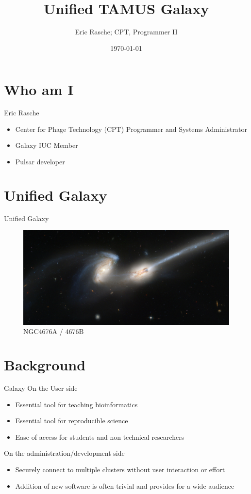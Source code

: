 \documentclass[]{beamer}
\title[TAMUS Galaxy]{Unified TAMUS Galaxy}
\author{Eric Rasche; CPT, Programmer II}
\date{\today}
\begin{document}
\frame{\titlepage}
\section{Who am I}
\begin{frame}{Eric Rasche}
\begin{itemize}
\item
    Center for Phage Technology (CPT) Programmer and Systems Administrator
\item
    Galaxy IUC Member
\item
    Pulsar developer
\end{itemize}
\end{frame}


\section{Unified Galaxy}
\begin{frame}{Unified Galaxy}
\begin{figure}[htbp]
\centering
\includegraphics[scale=0.20]{NGC4676.png}
\caption{NGC4676A / 4676B}
\end{figure}
\end{frame}


\section{Background}
\begin{frame}{Galaxy}
On the User side
\begin{itemize}
\item
    Essential tool for teaching bioinformatics
\item
    Essential tool for reproducible science
\item
    Ease of access for students and non-technical researchers
\end{itemize}

On the administration/development side
\begin{itemize}
\item
    Securely connect to multiple clusters without user interaction or effort
\item
    Addition of new software is often trivial and provides for a wide
    audience
\end{itemize}
\end{frame}
\end{document}
